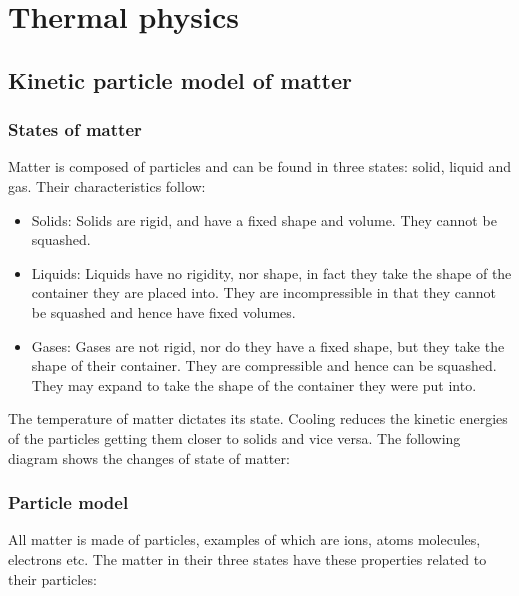 \section{Thermal physics}
\subsection{Kinetic particle model of matter}
\subsubsection{States of matter}

Matter is composed of particles and can be found in three states: solid, liquid and gas. Their 
characteristics follow:
\begin{itemize}
	\item Solids:
		Solids are rigid, and have a fixed shape and volume. They cannot be squashed.
	
	\item Liquids: 
		Liquids have no rigidity, nor shape, in fact they take the shape of the container they are
		placed into. They are incompressible in that they cannot be squashed and hence have fixed
		volumes.
	
	\item Gases: 
		Gases are not rigid, nor do they have a fixed shape, but they take the shape of their 
		container. They are compressible and hence can be squashed. They may expand to take the
		shape of the container they were put into.
\end{itemize}

The temperature of matter dictates its state. Cooling reduces the kinetic energies of the particles
getting them closer to solids and vice versa. The following diagram shows the changes of state of
matter:

\begin{center}
\end{center}

\subsubsection{Particle model}
All matter is made of particles, examples of which are ions, atoms molecules, electrons etc. The
matter in their three states have these properties related to their particles:

